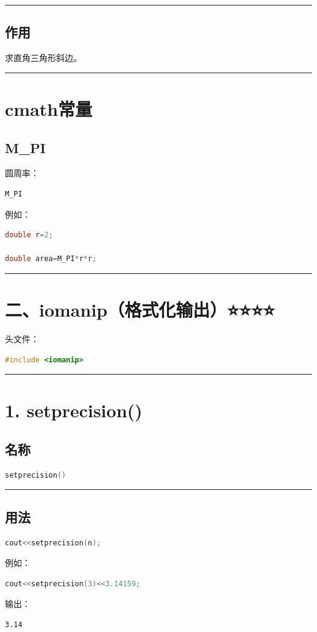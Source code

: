 \documentclass[9pt,twocolumn]{extarticle}
\begin{document}
\noindent\rule{\linewidth}{0.4pt}

\subsection{作用}
求直角三角形斜边。

\noindent\rule{\linewidth}{0.4pt}

\section{cmath常量}

\subsection{M\_PI}
圆周率：
\begin{lstlisting}[language=C++]
M_PI
\end{lstlisting}
例如：
\begin{lstlisting}[language=C++]
double r=2;

double area=M_PI*r*r;
\end{lstlisting}

\noindent\rule{\linewidth}{0.4pt}

\section{二、iomanip（格式化输出）⭐⭐⭐⭐}

头文件：
\begin{lstlisting}[language=C++]
#include <iomanip>
\end{lstlisting}

\noindent\rule{\linewidth}{0.4pt}

\section{1. setprecision()}

\subsection{名称}
\begin{lstlisting}[language=C++]
setprecision()
\end{lstlisting}

\noindent\rule{\linewidth}{0.4pt}

\subsection{用法}
\begin{lstlisting}[language=C++]
cout<<setprecision(n);
\end{lstlisting}
例如：
\begin{lstlisting}[language=C++]
cout<<setprecision(3)<<3.14159;
\end{lstlisting}
输出：
\begin{lstlisting}
3.14
\end{lstlisting}
\end{document}
